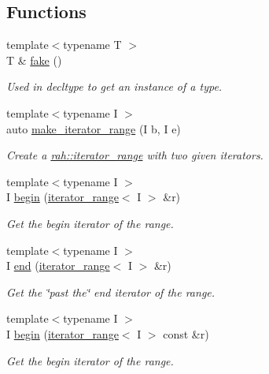 \subsection*{Functions}
\begin{DoxyCompactItemize}
\item 
{\footnotesize template$<$typename T $>$ }\\T \& \mbox{\hyperlink{namespacerah_aa659f5ae02cb923cd8813f96cfd86a25}{fake}} ()
\begin{DoxyCompactList}\small\item\em Used in decltype to get an instance of a type. \end{DoxyCompactList}\item 
{\footnotesize template$<$typename I $>$ }\\auto \mbox{\hyperlink{namespacerah_a0a3dd43bb465c99137bfdebb2292b102}{make\+\_\+iterator\+\_\+range}} (I b, I e)
\begin{DoxyCompactList}\small\item\em Create a \mbox{\hyperlink{structrah_1_1iterator__range}{rah\+::iterator\+\_\+range}} with two given iterators. \end{DoxyCompactList}\item 
{\footnotesize template$<$typename I $>$ }\\I \mbox{\hyperlink{namespacerah_a2c4a19e57cc4e0753e93830f247def6d}{begin}} (\mbox{\hyperlink{structrah_1_1iterator__range}{iterator\+\_\+range}}$<$ I $>$ \&r)
\begin{DoxyCompactList}\small\item\em Get the begin iterator of the range. \end{DoxyCompactList}\item 
{\footnotesize template$<$typename I $>$ }\\I \mbox{\hyperlink{namespacerah_aaddd1442cd76b96876e692cdefe7261d}{end}} (\mbox{\hyperlink{structrah_1_1iterator__range}{iterator\+\_\+range}}$<$ I $>$ \&r)
\begin{DoxyCompactList}\small\item\em Get the \char`\"{}past the\char`\"{} end iterator of the range. \end{DoxyCompactList}\item 
{\footnotesize template$<$typename I $>$ }\\I \mbox{\hyperlink{namespacerah_a14e69321e6772651b349cb31467ea3a2}{begin}} (\mbox{\hyperlink{structrah_1_1iterator__range}{iterator\+\_\+range}}$<$ I $>$ const \&r)
\begin{DoxyCompactList}\small\item\em Get the begin iterator of the range. \end{DoxyCompactList}\item 

\end{DoxyCompactItemize}
